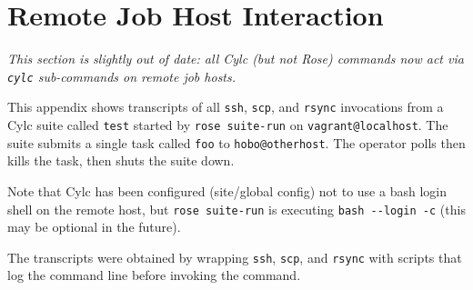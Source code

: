 \section{Remote Job Host Interaction}

\lstset{language=jobhosts}

{\em This section is slightly out of date: all Cylc (but not Rose) commands
now act via \lstinline=cylc= sub-commands on remote job hosts.}

This appendix shows transcripts of all \lstinline=ssh=, \lstinline=scp=, and
\lstinline=rsync= invocations from a Cylc suite called \lstinline=test= started by
\lstinline=rose suite-run= on \lstinline=vagrant@localhost=. The suite
submits a single task called \lstinline=foo= to \lstinline=hobo@otherhost=.
The operator polls then kills the task, then shuts the suite down.

Note that Cylc has been configured (site/global config) not to use a bash login
shell on the remote host, but \lstinline=rose suite-run= is executing
\lstinline=bash --login -c= (this may be optional in the future).

The transcripts were obtained by wrapping \lstinline=ssh=, \lstinline=scp=, and
\lstinline=rsync= with scripts that log the command line before invoking the
command.

